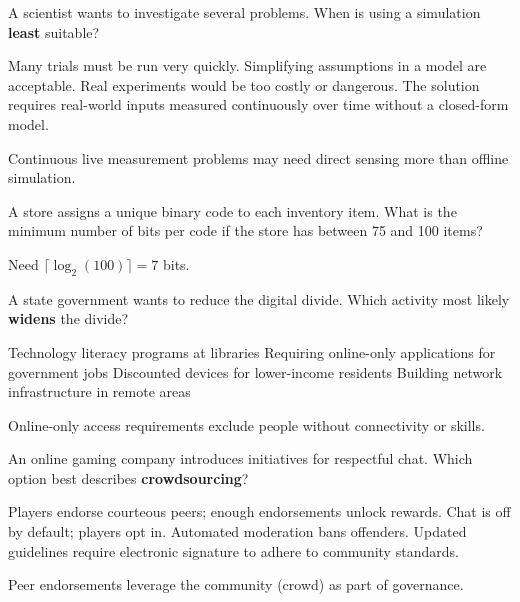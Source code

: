 \question[5]
A scientist wants to investigate several problems. When is using a simulation \textbf{least} suitable?
\begin{choices}
  \choice Many trials must be run very quickly.
  \choice Simplifying assumptions in a model are acceptable.
  \choice Real experiments would be too costly or dangerous.
  \CorrectChoice The solution requires real-world inputs measured continuously over time without a closed-form model.
\end{choices}
\begin{solution}
  Continuous live measurement problems may need direct sensing more than offline simulation.
\end{solution}



\question[5]
A store assigns a unique binary code to each inventory item. What is the minimum number of bits per code if the store has between 75 and 100 items?
\begin{choices}
\end{choices}
\begin{solution}
  Need $\lceil\log_2(100)\rceil = 7$ bits.
\end{solution}



\newpage



\question[5]
A state government wants to reduce the digital divide. Which activity most likely \textbf{widens} the divide?
\begin{choices}
  \choice Technology literacy programs at libraries
  \CorrectChoice Requiring online-only applications for government jobs
  \choice Discounted devices for lower-income residents
  \choice Building network infrastructure in remote areas
\end{choices}
\begin{solution}
  Online-only access requirements exclude people without connectivity or skills.
\end{solution}

\question[5]
An online gaming company introduces initiatives for respectful chat. Which option best describes \textbf{crowdsourcing}?
\begin{choices}
  \CorrectChoice Players endorse courteous peers; enough endorsements unlock rewards.
  \choice Chat is off by default; players opt in.
  \choice Automated moderation bans offenders.
  \choice Updated guidelines require electronic signature to adhere to community standards.
\end{choices}
\begin{solution}
  Peer endorsements leverage the community (crowd) as part of governance.
\end{solution}



